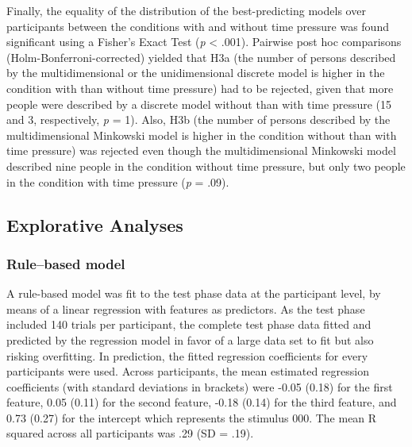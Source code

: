 \documentclass[a4paper,man,natbib]{apa6}
\begin{document}
Finally, the equality of the distribution of the best-predicting models over participants between the conditions with and without time pressure was found significant using a Fisher's Exact Test (\textit{p} < .001). Pairwise post hoc comparisons (Holm-Bonferroni-corrected) yielded that H3a (the number of persons described by the multidimensional or the unidimensional discrete model is higher in the condition with than without time pressure) had to be rejected, given that more people were described by a discrete model without than with time pressure (15 and 3, respectively, \textit{p} = 1). Also, H3b (the number of persons described by the multidimensional Minkowski model is higher in the condition without than with time pressure) was rejected even though the multidimensional Minkowski model described nine people in the condition without time pressure, but only two people in the condition with time pressure (\textit{p} = .09).

\subsection{Explorative Analyses}

\subsubsection{Rule--based model}
A rule-based model was fit to the test phase data at the participant level, by means of a linear regression with features as predictors. As the test phase included 140 trials per participant, the complete test phase data fitted and predicted by the regression model in favor of a large data set to fit but also risking overfitting. In prediction, the fitted regression coefficients for every participants were used. Across participants, the mean estimated regression coefficients (with standard deviations in brackets) were -0.05 (0.18) for the first feature, 0.05 (0.11) for the second feature, -0.18 (0.14) for the third feature, and 0.73 (0.27) for the intercept which represents the stimulus 000. The mean R squared across all participants was .29 (SD = .19).
\end{document}
